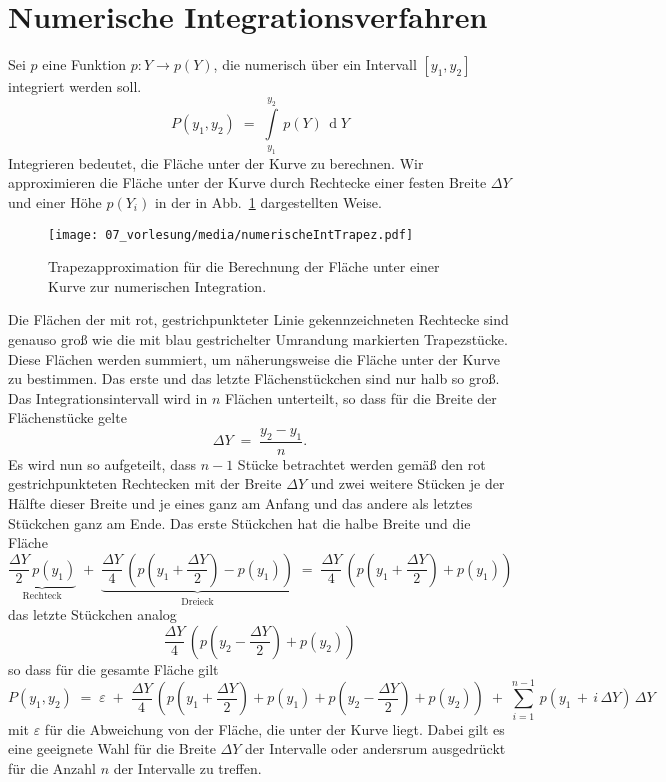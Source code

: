 
\section{Numerische Integrationsverfahren}
Sei $p$ eine Funktion $p \! : Y \rightarrow p(Y)$, die numerisch über ein
Intervall $[y_1, y_2]$ integriert werden soll.
\begin{equation}
P(y_1, y_2) \; = \; \int\limits_{y_1}^{y_2} \, p(Y) \, \operatorname{d}Y
\end{equation}
Integrieren bedeutet, die Fläche unter der Kurve zu berechnen. Wir approximieren die
Fläche unter der Kurve durch Rechtecke einer festen Breite $\Delta Y$ und einer Höhe
$p(Y_i)$ in der in Abb.~\ref{Trapez} dargestellten Weise.
\begin{figure}
\begin{center}
\texttt{[image: 07\_vorlesung/media/numerischeIntTrapez.pdf]}
\caption{\label{Trapez} Trapezapproximation für die Berechnung der Fläche unter einer
Kurve zur numerischen Integration.}
\end{center}
\end{figure}
Die Flächen der mit rot, gestrichpunkteter Linie gekennzeichneten Rechtecke sind genauso
groß wie die mit blau gestrichelter Umrandung markierten Trapezstücke. Diese Flächen
werden summiert, um näherungsweise die Fläche unter der Kurve zu bestimmen.
Das erste und das letzte Flächenstückchen sind nur halb so groß.
Das Integrationsintervall wird in $n$ Flächen unterteilt, so dass für die Breite
der Flächenstücke gelte
\begin{equation}
\Delta Y \; = \; \frac{y_2 - y_1}{n} .
\end{equation}
Es wird nun so aufgeteilt, dass $n-1$ Stücke betrachtet werden gemäß den rot
gestrichpunkteten Rechtecken mit der Breite $\Delta Y$ und zwei weitere Stücken je
der Hälfte dieser Breite und je eines ganz am Anfang und das andere als letztes
Stückchen ganz am Ende.
Das erste Stückchen hat die halbe Breite und die Fläche
$$
\underbrace{\frac{\Delta Y}{2} \, p(y_1)}_{\mathrm{Rechteck}}
 \; + \;
\underbrace{\frac{\Delta Y}{4} \, (p(y_1 + \frac{\Delta Y}{2}) - p(y_1))}_{\mathrm{Dreieck}}
\; = \;
\frac{\Delta Y}{4} \, (p(y_1 + \frac{\Delta Y}{2}) + p(y_1))
$$
das letzte Stückchen analog
$$
\frac{\Delta Y}{4} \, (p(y_2 - \frac{\Delta Y}{2}) + p(y_2))
$$
so dass für die gesamte Fläche gilt
\begin{equation}
P(y_1, y_2) \; = \; \varepsilon \; + \;
\frac{\Delta Y}{4} \, \left(p(y_1 + \frac{\Delta Y}{2}) + p(y_1) +
p(y_2 - \frac{\Delta Y}{2}) + p(y_2)\right) \; + \;
\sum\limits_{i=1}^{n-1} \,
p(y_1 \, + \, i \, \Delta Y) \, \Delta Y
\end{equation}
mit $\varepsilon$ für die Abweichung von der Fläche, die unter der Kurve liegt.
Dabei gilt es eine geeignete Wahl für die Breite $\Delta Y$ der Intervalle
oder andersrum ausgedrückt für die Anzahl $n$ der Intervalle zu treffen.

